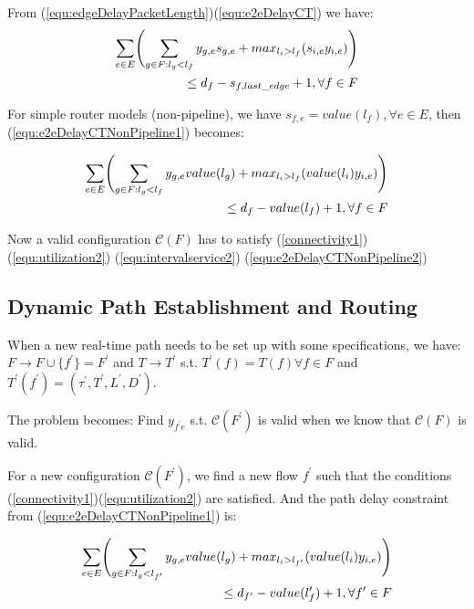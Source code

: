 \documentclass[conference, twocolumn]{IEEEtran}
\theoremstyle{definition}
\begin{document}

From (\ref{equ:edgeDelayPacketLength})(\ref{equ:e2eDelayCT}) we have:
\begin{eqnarray}\label{equ:e2eDelayCTNonPipeline1}
\sum_{e \in E} \Biggl(\sum_{g \in F:l_g <
l_f}y_{g,e}s_{g,e} +max_{l_i>l_f}(s_{i,e}y_{i,e})\Biggr)\notag \\ \leq
d_f-s_{f,last\_edge} + 1, \forall f \in F
\end{eqnarray}

For simple router models (non-pipeline), we have $s_{f,e} = value(l_f),\forall e
\in E$, then (\ref{equ:e2eDelayCTNonPipeline1}) becomes:

\begin{eqnarray}\label{equ:e2eDelayCTNonPipeline2}
\sum_{e \in E} \Biggl(\sum_{g \in F:l_g <
l_f}y_{g,e}value(l_g) +max_{l_i>l_f}(value(l_i)y_{i,e})\Biggr)\notag \\ \leq
d_f-value(l_f) + 1, \forall f \in F
\end{eqnarray}

Now a valid configuration $\mathcal{C}(F)$ has to satisfy (\ref{connectivity1}) 
(\ref{equ:utilization2})
(\ref{equ:intervalservice2}) (\ref{equ:e2eDelayCTNonPipeline2})

\subsection{Dynamic Path Establishment and Routing}
When a new real-time path needs to be set up with some specifications, we have:
$F \rightarrow F \cup \{f^{'} \}=F^{'}$
and $T \rightarrow T^{'}$ s.t. $T^{'} (f)=T(f)\forall f \in F$ and $T^{'}
(f^{'})=(\tau ^{'}, T^{'}, L^{'}, D^{'})$.

The problem becomes: Find $y_{f^{'}e}$ s.t. $\mathcal{C}(F^{'})$ is valid
when we know that $\mathcal{C}(F)$ is valid.

For a new configuration $\mathcal{C}(F^{'})$, we find a new flow $f^{'}$ such that
the conditions (\ref{connectivity1})(\ref{equ:utilization2}) are satisfied. And
the path delay constraint from (\ref{equ:e2eDelayCTNonPipeline1}) is:

\begin{eqnarray}\label{equ:e2eDelayNewPath1}
\sum_{e \in E} \Biggl(\sum_{g \in F:l_g <
l_{f'}}y_{g,e}value(l_g) +max_{l_i>l_{f'}}(value(l_i)y_{i,e})\Biggr)\notag \\
\leq d_{f'}-value(l_f') + 1, \forall f' \in F
\end{eqnarray}
\end{document}
